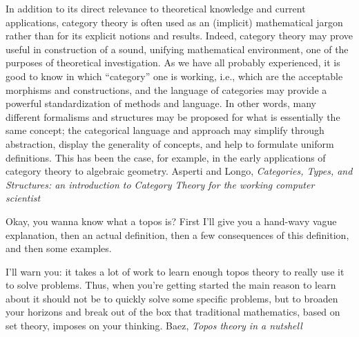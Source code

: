 \documentclass[11pt,openany]{book}
\begin{document}
\begin{boxquote}
In addition to its direct relevance to theoretical knowledge and current applications, category theory
is often used as an (implicit) mathematical jargon rather than for its explicit notions and results.
Indeed, category theory may prove useful in construction of a sound, unifying mathematical
environment, one of the purposes of theoretical investigation. As we have all probably experienced, it
is good to know in which ``category'' one is working, i.e., which are the acceptable morphisms and
constructions, and the language of categories may provide a powerful standardization of methods and
language. In other words, many different formalisms and structures may be proposed for what is
essentially the same concept; the categorical language and approach may simplify through abstraction,
display the generality of concepts, and help to formulate uniform definitions. This has been the case,
for example, in the early applications of category theory to algebraic geometry.
\tcblower
{Asperti and Longo, \emph{Categories, Types, and Structures: 
an introduction to Category Theory for the working computer scientist}~\cite{AspertiLongo:1991}}
\end{boxquote}

\begin{boxquote}
Okay, you wanna know what a topos is? 
First I'll give you a hand-wavy vague explanation, 
then an actual definition, 
then a few consequences of this definition, 
and then some examples.
\par
I'll warn you: 
it takes a lot of work to learn enough topos theory 
to really use it to solve problems. 
Thus, when you're getting started the main reason to learn 
about it should not be to quickly solve some specific problems, 
but to broaden your horizons and break out of the box 
that traditional mathematics, based on set theory, 
imposes on your thinking.
\tcblower
{Baez, \emph{Topos theory in a 
nutshell}~\cite{Baez:2017:ToposNutshell}}
\end{boxquote}
\end{document}
